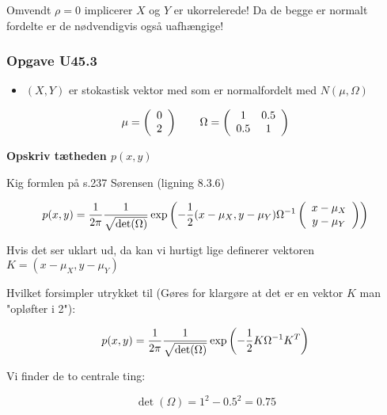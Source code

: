 Omvendt $\rho=0$ implicerer $X$ og $Y$ er ukorrelerede! Da de begge er normalt fordelte er de nødvendigvis også uafhængige!

\subsubsection{Opgave U45.3}

\begin{itemize}
    \item $(X, Y)$ er stokastisk vektor med som er normalfordelt med $N(\mu, \Omega)$
\end{itemize}

\begin{equation}
    \mu = \left(
    \begin{array}{cc}
         0  \\
         2 
    \end{array}\right) \qquad
    \Omega = \left(
    \begin{array}{cc}
        1 & 0.5 \\
        0.5 & 1
    \end{array} \right)
\end{equation}

\textbf{Opskriv tætheden $p(x,y)$}

Kig formlen på s.237 Sørensen (ligning 8.3.6)

\begin{equation}
    p(x,y) = \frac{1}{2\pi}\frac{1}{\sqrt{\det(\Omega)}}\exp\left(-\frac{1}{2}(x - \mu_X, y - \mu_Y)\Omega^{-1}
    \left(
    \begin{array}{cc}
         x - \mu_X  \\
         y - \mu_Y 
    \end{array} 
    \right)
    \right)
\end{equation}

Hvis det ser uklart ud, da kan vi hurtigt lige definerer vektoren $K = (x - \mu_X, y - \mu_Y)$

Hvilket forsimpler utrykket til (Gøres for klargøre at det er en vektor $K$ man "opløfter i 2"): 

\begin{equation}
    p(x,y) = \frac{1}{2\pi}\frac{1}{\sqrt{\det(\Omega)}}\exp\left(-\frac{1}{2}K \Omega^{-1} K^T    \right)
\end{equation}

Vi finder de to centrale ting:

\begin{equation}
    \det(\Omega) = 1^2 - 0.5^2 = 0.75
\end{equation}


